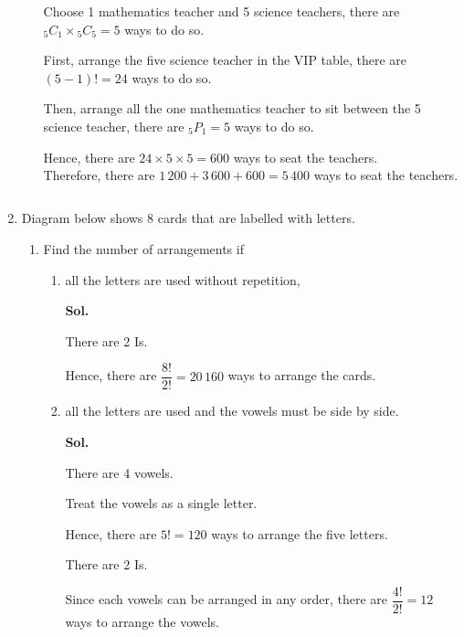 \documentclass{report}
\newcommand\permtwo[2][^n]{{}_{#1}P_{#2}}
\newcommand\comb[2][^n]{{}_{#1}C_{#2}}
\newcommand{\sol}[1]{

      \noindent \textbf{Sol.}
}
\def\eos{\quad\hbox{\rlap{\hbox{\vrule depth 1.5pt height 2.6mm width 0.2mm \hskip 1mm \vrule height 2.6mm width 0.2mm}}{\vbox{\hrule height 0.2mm width 1.4mm \vskip 2.8mm \hrule depth 1.5pt height -0.35mm width 1.2mm}}}}
\begin{document}
\begin{multicols*}{2}
\begin{enumerate}
\begin{enumerate}
                              Choose 1 mathematics teacher and 5 science teachers, there are $\comb[5]{1}
                                    \times \comb[5]{5} = 5$ ways to do so.

                              First, arrange the five science teacher in the VIP table, there are $(5 - 1)! =
                                    24$ ways to do so.

                              Then, arrange all the one mathematics teacher to sit between the 5 science
                              teacher, there are $\permtwo[5]{1} = 5$ ways to do so.

                              Hence, there are $24 \times 5 \times 5 = 600$ ways to seat the teachers.\\

                              Therefore, there are $1\,200 + 3\,600 + 600 = 5\,400$ ways to seat the
                              teachers. $\eos$
                  \end{enumerate}

            \item Diagram below shows 8 cards that are labelled with letters.
                  \begin{enumerate}
                        \item Find the number of arrangements if
                              \begin{enumerate}
                                    \item all the letters are used without repetition, \sol{}

                                          There are 2 Is.

                                          Hence, there are $\dfrac{8!}{2!} = 20\,160$ ways to arrange the cards. $\eos$

                                    \item all the letters are used and the vowels must be side by side. \sol{}

                                          There are 4 vowels.

                                          Treat the vowels as a single letter.

                                          Hence, there are $5! = 120$ ways to arrange the five letters.

                                          There are 2 Is.

                                          Since each vowels can be arranged in any order, there are $\dfrac{4!}{2!} = 12$
                                          ways to arrange the vowels.


\end{enumerate}
\end{enumerate}
\end{enumerate}
\end{multicols*}
\end{document}
